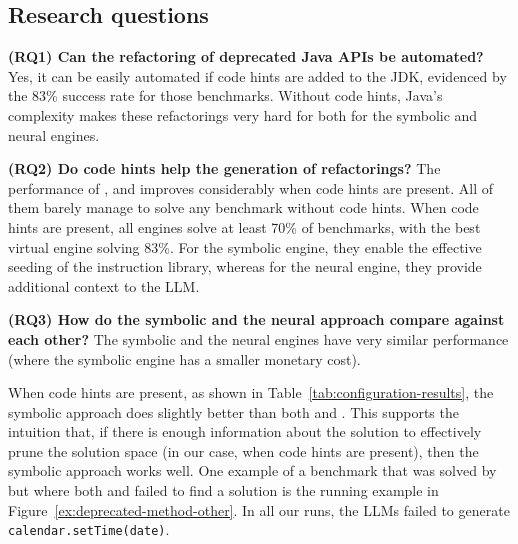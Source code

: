\documentclass[conference]{IEEEtran}
\begin{document}
\subsection{Research questions}

{\bf (RQ1) Can the refactoring of deprecated Java APIs be automated?}
%
Yes, it can be easily automated if code hints are added to the JDK,
evidenced by the 83\% success rate for those benchmarks.  Without code
hints, Java's complexity makes these refactorings very hard for both for the
symbolic and neural engines.

\noindent
{\bf (RQ2) Do code hints help the generation of refactorings?}
%
The performance of \tool, \llma and \llmb improves considerably when code
hints are present.  All of them barely manage to solve any benchmark without
code hints.  When code hints are present, all engines solve at least 70\% of
benchmarks, with the best virtual engine solving 83\%.  For the symbolic
engine, they enable the effective seeding of the instruction library,
whereas for the neural engine, they provide additional context to the LLM.

\noindent
{\bf (RQ3) How do the symbolic and the neural approach compare against each other?}
%
The symbolic and the neural engines have very similar performance (where the symbolic engine has a smaller monetary cost).



When code hints are present, as shown in
Table~\ref{tab:configuration-results}, the symbolic approach does slightly
better than both \llma and \llmb.  This supports the intuition that, if
there is enough information about the solution to effectively prune the
solution space (in our case, when code hints are present),
%
then the symbolic approach works well. %
%
One example of a benchmark that was solved by \tool but where both \llma and
\llmb failed to find a solution is the running example in
Figure~\ref{ex:deprecated-method-other}.  In all our runs, the LLMs failed
to generate \lstinline[breaklines=true]{calendar.setTime(date)}.
\end{document}

